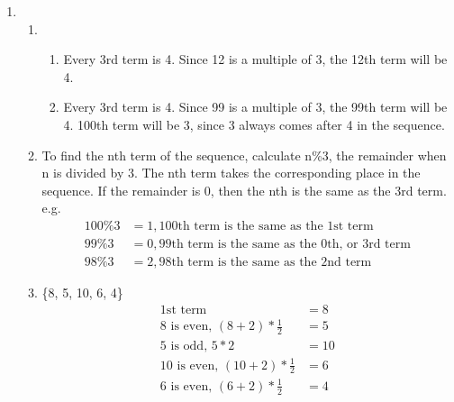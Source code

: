 \documentclass[11pt]{article}
\begin{document}
\begin{enumerate}
    \pagebreak
    \item
        \begin{enumerate}
            \item
                \begin{enumerate}
                    \item 
                        Every 3rd term is 4. Since 12 is a multiple of 3, the 12th term will be 4.
                    \item
                        Every 3rd term is 4. Since 99 is a multiple of 3, the 99th term will be 4.
                        100th term will be 3, since 3 always comes after 4 in the sequence.
                \end{enumerate}
            \item 
                To find the nth term of the sequence, calculate n\%3, the remainder when n is divided by 3.
                The nth term takes the corresponding place in the sequence. If the remainder is 0, then the nth is the same as the 3rd term. e.g.
                \begin{equation*}
                    \begin{split}
                        100\%3&=1, \text{100th term is the same as the 1st term}\\
                        99\%3&=0, \text{99th term is the same as the 0th, or 3rd term}\\
                        98\%3&=2, \text{98th term is the same as the 2nd term}
                    \end{split}
                \end{equation*}
            \item
                \{8, 5, 10, 6, 4\}
                \begin{equation*}
                    \begin{split}
                        \text{1st term}&=8\\
                        \text{8 is even, }(8+2)*\frac{1}{2}&=5\\
                        \text{5 is odd, }5*2&=10\\
                        \text{10 is even, }(10+2)*\frac{1}{2}&=6\\
                        \text{6 is even, }(6+2)*\frac{1}{2}&=4\\
                    \end{split}
                \end{equation*}


\end{enumerate}
\end{enumerate}
\end{document}
